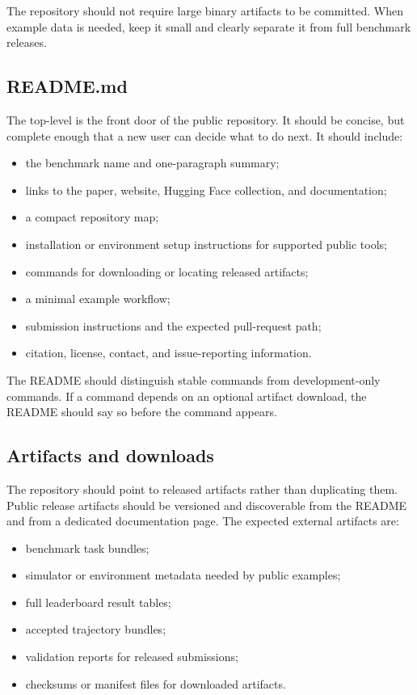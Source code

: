 \documentclass[11pt]{article}
\begin{document}
The repository should not require large binary artifacts to be committed.
When example data is needed, keep it small and clearly separate it from full benchmark releases.

\label{sec:public-repository-readme}
\subsection*{README.md}

The top-level  is the front door of the public repository.
It should be concise, but complete enough that a new user can decide what to do next.
It should include:

\begin{itemize}
\item the benchmark name and one-paragraph summary;
\item links to the paper, website, Hugging Face collection, and documentation;
\item a compact repository map;
\item installation or environment setup instructions for supported public tools;
\item commands for downloading or locating released artifacts;
\item a minimal example workflow;
\item submission instructions and the expected pull-request path;
\item citation, license, contact, and issue-reporting information.
\end{itemize}

The README should distinguish stable commands from development-only commands.
If a command depends on an optional artifact download, the README should say so before the command appears.

\label{sec:public-repository-artifacts}
\subsection*{Artifacts and downloads}

The repository should point to released artifacts rather than duplicating them.
Public release artifacts should be versioned and discoverable from the README and from a dedicated documentation page.
The expected external artifacts are:

\begin{itemize}
\item benchmark task bundles;
\item simulator or environment metadata needed by public examples;
\item full leaderboard result tables;
\item accepted trajectory bundles;
\item validation reports for released submissions;
\item checksums or manifest files for downloaded artifacts.
\end{itemize}
\end{document}
